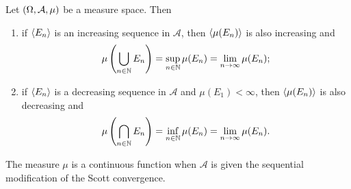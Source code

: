 \begin{proposition}
Let $\left( \Omega, \mathcal{A}, \mu \right)$ be a measure space. Then
\begin{enumerate}
\item if $\left\langle E_n \right\rangle$ is an increasing sequence in $\mathcal{A}$, then $\left\langle \mu(E_n) \right\rangle$ is also increasing and
\[ \mu\left(\bigcup_{n\in\mathbb{N}}E_n\right) = \sup_{n\in\mathbb{N}}\mu(E_n) = \lim_{n\to\infty}\mu(E_n); \]
\item if $\left\langle E_n \right\rangle$ is a decreasing sequence in $\mathcal{A}$ and $\mu(E_1)<\infty$, then $\left\langle \mu(E_n) \right\rangle$ is also decreasing and
\[ \mu\left(\bigcap_{n\in\mathbb{N}}E_n\right) = \inf_{n\in\mathbb{N}}\mu(E_n) = \lim_{n\to\infty}\mu(E_n). \]
\end{enumerate}
\end{proposition}
\begin{corollary}
The measure $\mu$ is a continuous function when $\mathcal{A}$ is given the sequential modification of the Scott convergence.
\end{corollary}


